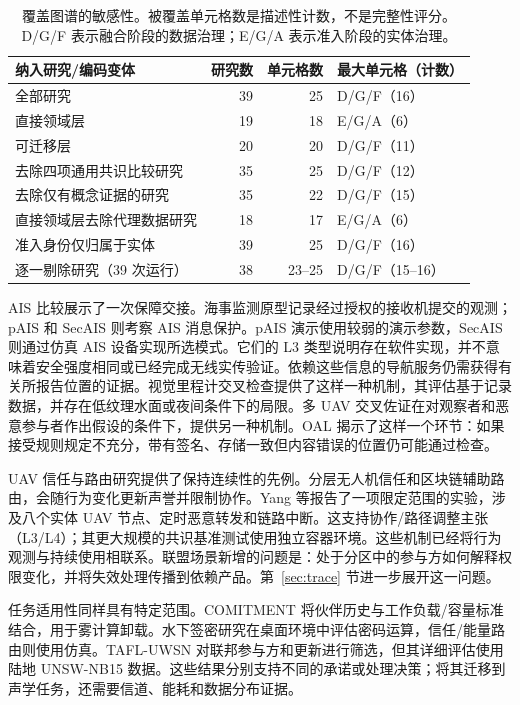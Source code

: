 \begin{table}[H]\small
\caption{覆盖图谱的敏感性。被覆盖单元格数是描述性计数，不是完整性评分。D/G/F 表示融合阶段的数据治理；E/G/A 表示准入阶段的实体治理。}\label{tab:sensitivity}
\begin{tabularx}{\textwidth}{@{}YrrP{32mm}@{}}\toprule
\textbf{纳入研究/编码变体} & \textbf{研究数} & \textbf{单元格数} & \textbf{最大单元格（计数）}\\\midrule
全部研究 & 39 & 25 & D/G/F（16）\\
直接领域层 & 19 & 18 & E/G/A（6）\\
可迁移层 & 20 & 20 & D/G/F（11）\\
去除四项通用共识比较研究 & 35 & 25 & D/G/F（12）\\
去除仅有概念证据的研究 & 35 & 22 & D/G/F（15）\\
直接领域层去除代理数据研究 & 18 & 17 & E/G/A（6）\\
准入身份仅归属于实体 & 39 & 25 & D/G/F（16）\\
逐一剔除研究（39 次运行） & 38 & 23--25 & D/G/F（15--16）\\\bottomrule
\end{tabularx}\end{table}

AIS 比较展示了一次保障交接。海事监测原型记录经过授权的接收机提交的观测\citep{maritime2022monitoring}；pAIS 和 SecAIS 则考察 AIS 消息保护\citep{kessler2020protected,goudossis2022secais}。pAIS 演示使用较弱的演示参数，SecAIS 则通过仿真 AIS 设备实现所选模式。它们的 L3 类型说明存在软件实现，并不意味着安全强度相同或已经完成无线实传验证。依赖这些信息的导航服务仍需获得有关所报告位置的证据。视觉里程计交叉检查提供了这样一种机制，其评估基于记录数据，并存在低纹理水面或夜间条件下的局限\citep{varshosaz2019spoofing}。多 UAV 交叉佐证在对观察者和恶意参与者作出假设的条件下，提供另一种机制\citep{garcamagario2019security,barka2022towards}。OAL 揭示了这样一个环节：如果接受规则规定不充分，带有签名、存储一致但内容错误的位置仍可能通过检查。

UAV 信任与路由研究提供了保持连续性的先例。分层无人机信任和区块链辅助路由，会随行为变化更新声誉并限制协作\citep{hierarchical2023trust,yang2023trusted}。Yang 等报告了一项限定范围的实验，涉及八个实体 UAV 节点、定时恶意转发和链路中断。这支持协作/路径调整主张（L3/L4）；其更大规模的共识基准测试使用独立容器环境。这些机制已经将行为观测与持续使用相联系。联盟场景新增的问题是：处于分区中的参与方如何解释权限变化，并将失效处理传播到依赖产品。第~\ref{sec:trace} 节进一步展开这一问题。

任务适用性同样具有特定范围。COMITMENT 将伙伴历史与工作负载/容量标准结合，用于雾计算卸载\citep{alkhafajiy2020comitment}。水下签密研究在桌面环境中评估密码运算，信任/能量路由则使用仿真\citep{zhang2026underwater,eetauv2025trust}。TAFL-UWSN 对联邦参与方和更新进行筛选，但其详细评估使用陆地 UNSW-NB15 数据\citep{tafl2026underwater}。这些结果分别支持不同的承诺或处理决策；将其迁移到声学任务，还需要信道、能耗和数据分布证据。

